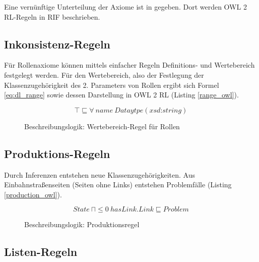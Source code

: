 \documentclass[runningheads,a4paper]{llncs}
\begin{document}
Eine vernünftige Unterteilung der Axiome ist in \cite{web_primer}   gegeben. 
Dort werden OWL 2 RL-Regeln in RIF \cite{owl2rif} beschrieben.


\subsection{Inkonsistenz-Regeln}
\label{sec:rule_inconsistency}

Für Rollenaxiome können mittels einfacher Regeln Definitions- und Wertebereich festgelegt werden. 
Für den Wertebereich, also der Festlegung der Klassenzugehörigkeit des 2. Parameters von Rollen ergibt sich Formel \eqref{eq:dl_range} sowie dessen Darstellung in OWL 2 RL (Listing \ref{range_owl}).

\begin{figure}
\begin{equation}
\top \sqsubseteq \forall\ name\ Dataytpe(\textit{xsd:string})
\label{eq:dl_range}
\end{equation}
\caption{Beschreibungslogik: Wertebereich-Regel für Rollen}
\end{figure}



\subsection{Produktions-Regeln}
\label{sec:rule_production}

Durch Inferenzen entstehen neue Klassenzugehörigkeiten. 
Aus Einbahnstraßenseiten (Seiten ohne Links) entstehen Problemfälle (Listing \ref{production_owl}). 
\begin{figure}
\begin{equation}
State\ \sqcap \leq 0\ hasLink.Link \sqsubseteq Problem
\label{eq:dl_infered}
\end{equation}
\caption{Beschreibungslogik: Produktionsregel}
\end{figure}



\subsection{Listen-Regeln}
\label{sec:rule_list}
\end{document}
